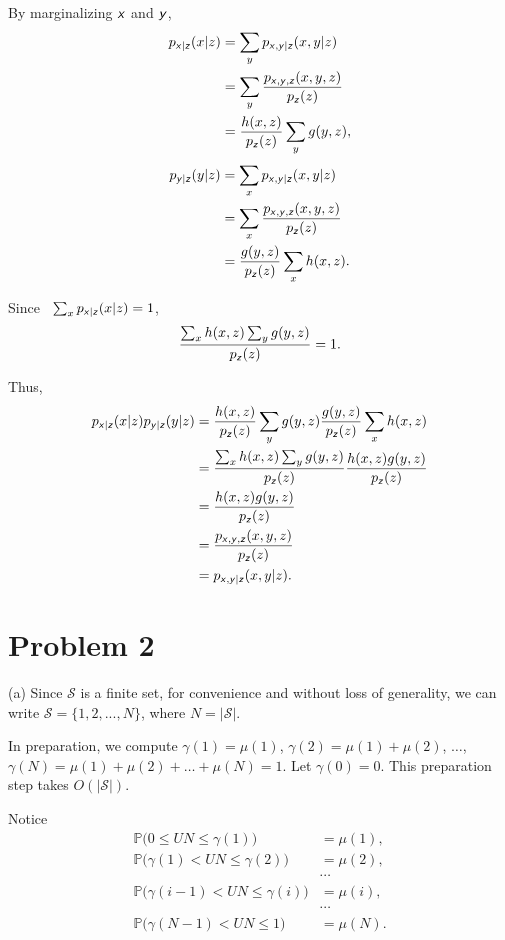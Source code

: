 \documentclass{article}
\newcommand{\s}[1]{\textsf{\textit{#1}}}
\newcommand{\qeds}{\hfill\qedsymbol}
\begin{document}
By marginalizing $\s{x}$ and $\s{y}$,
\begin{align*}
	p_{\s{x}|\s{z}}(x|z) &= \sum_y p_{\s{x}, \s{y}|\s{z}}(x, y|z)\\
	&= \sum_y \frac{p_{\s{x}, \s{y}, \s{z}}(x, y, z)}{p_{\s{z}}(z)}\\
	& = \frac{h(x, z)}{p_{\s{z}}(z)} \sum_y  g(y, z),
\end{align*}
\begin{align*}
	p_{\s{y}|\s{z}}(y|z) &= \sum_x p_{\s{x}, \s{y}|\s{z}}(x, y|z)\\
	&= \sum_x \frac{p_{\s{x}, \s{y}, \s{z}}(x, y, z)}{p_{\s{z}}(z)}\\
	& = \frac{g(y, z)}{p_{\s{z}}(z)} \sum_x  h(x, z).
\end{align*}

Since \, $\sum_x p_{\s{x}|\s{z}}(x|z) = 1$,
\begin{equation*}
	\frac{\sum_x h(x, z) \sum_y g(y, z)}{p_{\s{z}}(z)} = 1.
\end{equation*}

Thus,
\begin{align*}
	p_{\s{x}|\s{z}}(x|z)p_{\s{y}|\s{z}}(y|z) &= \frac{h(x, z)}{p_{\s{z}}(z)} \sum_y  g(y, z)\frac{g(y, z)}{p_{\s{z}}(z)} \sum_x  h(x, z) \\
	&= \frac{\sum_x h(x, z) \sum_y g(y, z)}{p_{\s{z}}(z)} \frac{h(x, z) g(y, z)}{p_{\s{z}}(z)}\\
	&= \frac{h(x, z) g(y, z)}{p_{\s{z}}(z)} \\
	&= \frac{p_{\s{x}, \s{y}, \s{z}}(x, y, z)}{p_{\s{z}}(z)} \\
	&= p_{\s{x},\s{y}|\s{z}}(x, y|z).
\end{align*} \qeds
\pagebreak


\section*{Problem 2}
(a)
%
Since $\mathscr{S}$ is a finite set, for convenience and without loss of generality,
we can write $\mathscr{S} = \{1, 2, ..., N\}$, where $N = |\mathscr{S}|$.

In preparation, we compute
$\gamma(1) = \mu(1)$, $\gamma(2) = \mu(1) + \mu(2)$, $\dots$,
$\gamma(N) = \mu(1) + \mu(2) + \dots + \mu(N) = 1$.
Let $\gamma(0) = 0$.
This preparation step takes $O(|\mathscr{S}|)$.

Notice
\begin{align*}
\mathbb{P}\Big(0 \leq UN \leq \gamma(1)\Big) &= \mu(1), \\
\mathbb{P}\Big(\gamma(1) < UN \leq \gamma(2)\Big) &= \mu(2), \\
	& \cdots \\
\mathbb{P}\Big(\gamma(i - 1) < UN \leq \gamma(i)\Big) &= \mu(i), \\	
	& \cdots \\
\mathbb{P}\Big(\gamma(N - 1) < UN \leq 1\Big) &= \mu(N). \\
\end{align*}
\end{document}
